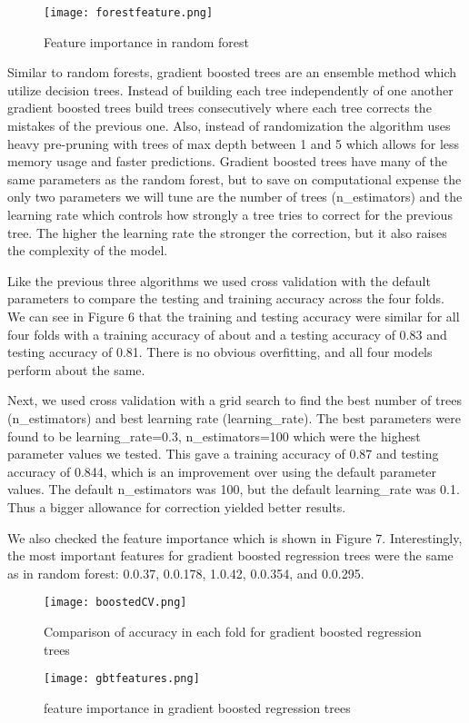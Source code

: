 \documentclass[12pt,letterpaper]{article}
\begin{document}
\begin{figure}[h]
	\centering
	\texttt{[image: forestfeature.png]}
	\caption{Feature importance in random forest}
\end{figure}

Similar to random forests, gradient boosted trees are an ensemble method which utilize decision trees. Instead of building each tree independently of one another gradient boosted trees build trees consecutively where each tree corrects the mistakes of the previous one. Also, instead of randomization the algorithm uses heavy pre-pruning with trees of max depth between 1 and 5 which allows for less memory usage and faster predictions. Gradient boosted trees have many of the same parameters as the random forest, but to save on computational expense the only two parameters we will tune are the number of trees (n\_estimators) and the learning rate which controls how strongly a tree tries to correct for the previous tree. The higher the learning rate the stronger the correction, but it also raises the complexity of the model.

Like the previous three algorithms we used cross validation with the default parameters to compare the testing and training accuracy across the four folds. We can see in Figure 6 that the training and testing accuracy were similar for all four folds with a training accuracy of about and a testing accuracy of 0.83 and testing accuracy of 0.81. There is no obvious overfitting, and all four models perform about the same. 

Next, we used cross validation with a grid search to find the best number of trees (n\_estimators) and best learning rate (learning\_rate). The best parameters were found to be learning\_rate=0.3, n\_estimators=100 which were the highest parameter values we tested. This gave a training accuracy of 0.87 and testing accuracy of 0.844,  which is an improvement over using the default parameter values. The default n\_estimators was 100, but the default learning\_rate was 0.1. Thus a bigger allowance for correction yielded better results.

We also checked the feature importance which is shown in Figure 7. Interestingly, the most important features for gradient boosted regression trees were the same as in random forest: 0.0.37, 0.0.178, 1.0.42, 0.0.354, and 0.0.295.

\begin{figure}[h]
	\centering
	\texttt{[image: boostedCV.png]}
	\caption{Comparison of accuracy in each fold for gradient boosted regression trees}
\end{figure}
\begin{figure}[h]
	\centering
	\texttt{[image: gbtfeatures.png]}
	\caption{feature importance in gradient boosted regression trees}
\end{figure}
\end{document}
